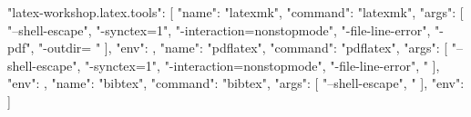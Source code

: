 "latex-workshop.latex.tools": [
  {
    "name": "latexmk",
    "command": "latexmk",
    "args": [
      "--shell-escape",
      "-synctex=1",
      "-interaction=nonstopmode",
      "-file-line-error",
      "-pdf",
      "-outdir=%
      "%
    ],
    "env": {}
  },
  {
    "name": "pdflatex",
    "command": "pdflatex",
    "args": [
      "--shell-escape",
      "-synctex=1",
      "-interaction=nonstopmode",
      "-file-line-error",
      "%
    ],
    "env": {}
  },
  {
    "name": "bibtex",
    "command": "bibtex",
    "args": [
      "--shell-escape",
      "%
    ],
    "env": {}
  }
]
